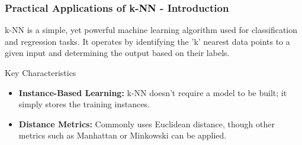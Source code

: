 \documentclass[aspectratio=169]{beamer}
\begin{document}
\begin{frame}[fragile]
    \frametitle{Practical Applications of k-NN - Introduction}
    k-NN is a simple, yet powerful machine learning algorithm used for classification and regression tasks. 
    It operates by identifying the 'k' nearest data points to a given input and determining the output based on their labels.
    
    \begin{block}{Key Characteristics}
        \begin{itemize}
            \item \textbf{Instance-Based Learning:} k-NN doesn’t require a model to be built; it simply stores the training instances.
            \item \textbf{Distance Metrics:} Commonly uses Euclidean distance, though other metrics such as Manhattan or Minkowski can be applied.
        \end{itemize}
    \end{block}
\end{frame}
\end{document}
